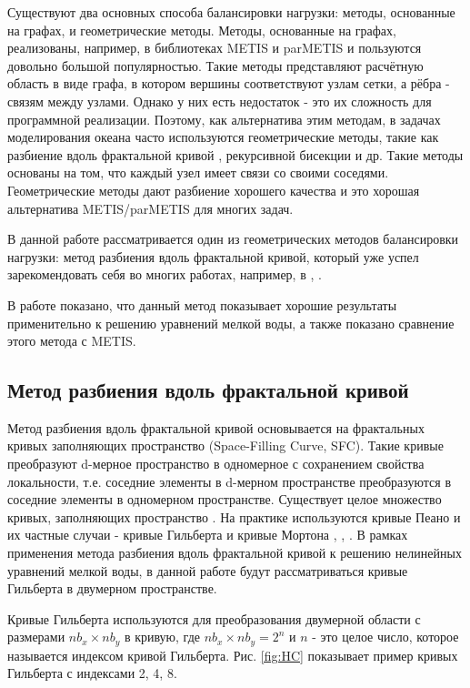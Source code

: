 Существуют два основных способа балансировки нагрузки: методы, основанные на графах, и геометрические методы. 
Методы, основанные на графах, реализованы, например, в библиотеках METIS и parMETIS \cite{METIS} и пользуются довольно большой популярностью. 
Такие методы представляют расчётную область в виде графа, в котором вершины соответствуют узлам сетки, а рёбра - связям между узлами.
Однако у них есть недостаток - это их сложность для программной реализации. 
Поэтому, как альтернатива этим методам, в задачах моделирования океана часто используются 
геометрические методы, такие как разбиение вдоль фрактальной кривой \cite{Dennis2007}, рекурсивной бисекции \cite{Rantakokko1998} и др. 
Такие методы основаны на том, что каждый узел имеет связи со своими соседями.
Геометрические методы дают разбиение хорошего качества и это хорошая альтернатива METIS/parMETIS для многих задач. 
    
В данной работе рассматривается один из геометрических методов балансировки нагрузки: метод разбиения вдоль фрактальной кривой, который
уже успел зарекомендовать себя во многих работах, например, в \cite{Dennis2007}, \cite{Hui2017}. 

В работе показано, что данный метод показывает хорошие результаты применительно к решению уравнений мелкой воды, а также показано сравнение этого метода с METIS.

\subsection{Метод разбиения вдоль фрактальной кривой}

Метод разбиения вдоль фрактальной кривой основывается на фрактальных кривых заполняющих пространство (Space-Filling Curve, SFC).
Такие кривые преобразуют d-мерное пространство в одномерное с сохранением свойства локальности,
т.е. соседние элементы в d-мерном пространстве преобразуются в соседние элементы в одномерном пространстве.
Существует целое множество кривых, заполняющих пространство \cite{SFC1994}. 
На практике используются кривые Пеано и их частные случаи - кривые Гильберта и кривые Мортона \cite{Dennis2007}, \cite{Hui2017}, \cite{gmd-7-267-2014}.
В рамках применения метода разбиения вдоль фрактальной кривой к решению нелинейных уравнений мелкой воды, 
в данной работе будут рассматриваться кривые Гильберта в двумерном пространстве.
    
Кривые Гильберта используются для преобразования двумерной области с размерами $nb_x \times nb_y$ в кривую, где
$nb_x \times nb_y = 2^n$ и $n$ - это целое число, которое называется индексом кривой Гильберта.
Рис. \ref{fig:HC} показывает пример кривых Гильберта с индексами 2, 4, 8.
    
